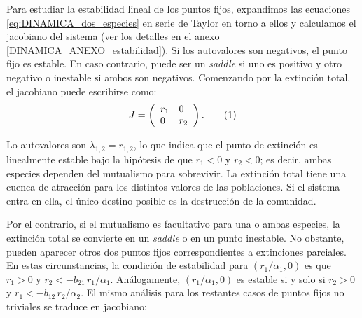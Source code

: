 Para estudiar la estabilidad lineal de los puntos fijos, expandimos las ecuaciones \ref{eq:DINAMICA_dos_especies} en serie de Taylor en torno a ellos y calculamos el jacobiano del sistema (ver los detalles en el anexo \ref{DINAMICA_ANEXO_estabilidad}). Si los autovalores son negativos, el punto fijo es estable. En caso contrario, puede ser un \textit{saddle} si uno es positivo y otro negativo o inestable si ambos son negativos. Comenzando por la extinción total, el jacobiano puede escribirse como: 
\begin{equation}
J = \left(
\begin{array}{ll}
r_{1}   & 0 \\
0 & r_{2} 
\end{array}
\right) .\stepcounter{equation}\tag{\theequation}\label{eq:J00}
\end{equation}

Lo autovalores son $\lambda_{1,2} = r_{1,2}$, lo que indica que el punto de extinción es linealmente estable bajo la hipótesis de que $r_{1}<0$ y $r_{2}<0$; es decir, ambas especies dependen del mutualismo para sobrevivir. La extinción total tiene una cuenca de atracción para los distintos valores de las poblaciones. Si el sistema entra en ella, el único destino posible es la destrucción de la comunidad.

Por el contrario, si el mutualismo es facultativo para una o ambas especies, la extinción total se convierte en un \textit{saddle} o en un punto inestable. No obstante, pueden aparecer otros dos puntos fijos correspondientes a extinciones parciales. En estas circunstancias, la condición de estabilidad para $(r_1/\alpha_1, 0)$ es que $r_{1}>0$ y $r_{2}<-b_{21}\, r_{1}/\alpha_{1}$. Análogamente, $(r_1/\alpha_1, 0)$ es estable si y solo si  $r_{2}>0$ y $r_{1}<-b_{12}\, r_{2}/\alpha_{2}$.
El mismo análisis para los restantes casos de puntos fijos no triviales se traduce en jacobiano:

